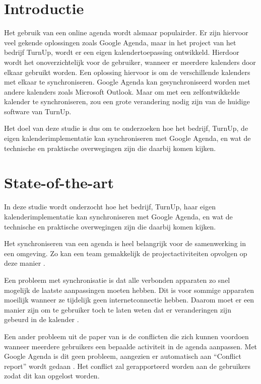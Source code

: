 
\section{Introductie}\sloppy
\label{sec:introductie}

Het gebruik van een online agenda wordt alsmaar populairder. Er zijn hiervoor veel gekende oplossingen zoals Google Agenda, maar in het project van het bedrijf TurnUp, wordt er een eigen kalendertoepassing ontwikkeld. Hierdoor wordt het onoverzichtelijk voor de gebruiker, wanneer er meerdere kalenders door elkaar gebruikt worden. Een oplossing hiervoor is om de verschillende kalenders met elkaar te synchroniseren. Google Agenda kan gesynchroniseerd worden met andere kalenders zoals Microsoft Outlook. Maar om met een zelfontwikkelde kalender te synchroniseren, zou een grote verandering nodig zijn van de huidige software van TurnUp.

Het doel van deze studie is dus om te onderzoeken hoe het bedrijf, TurnUp, de eigen kalenderimplementatie kan synchroniseren met Google Agenda, en wat de technische en praktische overwegingen zijn die daarbij komen kijken.


\section{State-of-the-art}%
\label{sec:state-of-the-art}

In deze studie wordt onderzocht hoe het bedrijf, TurnUp, haar eigen kalenderimplementatie kan synchroniseren met Google Agenda, en wat de technische en praktische overwegingen zijn die daarbij komen kijken.

Het synchroniseren van een agenda is heel belangrijk voor de samenwerking in een omgeving. Zo kan een team gemakkelijk de projectactiviteiten opvolgen op deze manier \autocite{Xhafa2016}.

Een probleem met synchronisatie is dat alle verbonden apparaten zo snel mogelijk de laatste aanpassingen moeten hebben. Dit is voor sommige apparaten moeilijk wanneer ze tijdelijk geen internetconnectie hebben. 
Daarom moet er een manier zijn om te gebruiker toch te laten weten dat er veranderingen zijn gebeurd in de kalender \autocite{Xhafa2016}.
 
Een ander probleem uit de paper van \textcite{Xhafa2016} is de conflicten die zich kunnen voordoen wanneer meerdere gebruikers een bepaalde activiteit in de agenda aanpassen.
Met Google Agenda is dit geen probleem, aangezien er automatisch aan ``Conflict report'' wordt gedaan \autocite{Google2023}.
Het conflict zal gerapporteerd worden aan de gebruikers zodat dit kan opgelost worden. 

